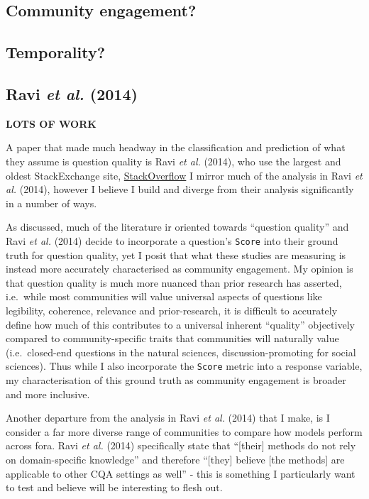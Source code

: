 \documentclass[11pt,preprint, authoryear]{article}
\numberwithin{equation}{section}
\begin{document}
\subsection{Community engagement?}\label{community-engagement}

\subsection{Temporality?}\label{temporality}

\subsection{\texorpdfstring{Ravi \emph{et al.}
(2014)}{Ravi et al. (2014)}}\label{ravi2014}

\textbf{LOTS OF WORK}

A paper that made much headway in the classification and prediction of
what they assume is question quality is Ravi \emph{et al.} (2014), who
use the largest and oldest StackExchange site,
\href{https://stackoverflow.com}{StackOverflow} I mirror much of the
analysis in Ravi \emph{et al.} (2014), however I believe I build and
diverge from their analysis significantly in a number of ways.

As discussed, much of the literature ir oriented towards ``question
quality'' and Ravi \emph{et al.} (2014) decide to incorporate a
question's \texttt{Score} into their ground truth for question quality,
yet I posit that what these studies are measuring is instead more
accurately characterised as community engagement. My opinion is that
question quality is much more nuanced than prior research has asserted,
i.e.~while most communities will value universal aspects of questions
like legibility, coherence, relevance and prior-research, it is
difficult to accurately define how much of this contributes to a
universal inherent ``quality'' objectively compared to
community-specific traits that communities will naturally value
(i.e.~closed-end questions in the natural sciences, discussion-promoting
for social sciences). Thus while I also incorporate the \texttt{Score}
metric into a response variable, my characterisation of this ground
truth as community engagement is broader and more inclusive.

Another departure from the analysis in Ravi \emph{et al.} (2014) that I
make, is I consider a far more diverse range of communities to compare
how models perform across fora. Ravi \emph{et al.} (2014) specifically
state that ``{[}their{]} methods do not rely on domain-specific
knowledge'' and therefore ``{[}they{]} believe {[}the methods{]} are
applicable to other CQA settings as well'' - this is something I
particularly want to test and believe will be interesting to flesh out.
\end{document}
